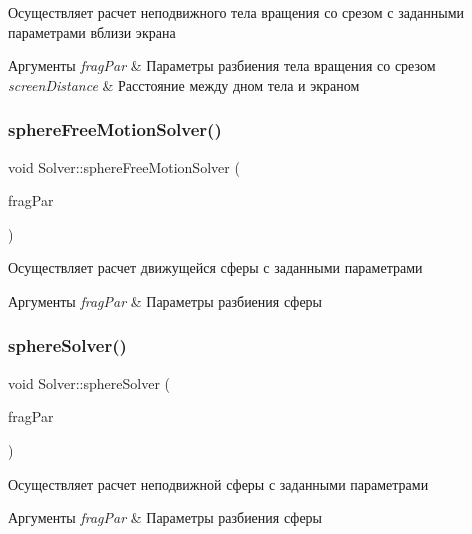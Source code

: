 Осуществляет расчет неподвижного тела вращения со срезом с заданными параметрами вблизи экрана 
\begin{DoxyParams}{Аргументы}
{\em frag\+Par} & Параметры разбиения тела вращения со срезом \\
\hline
{\em screen\+Distance} & Расстояние между дном тела и экраном \\
\hline
\end{DoxyParams}
\mbox{\label{class_solver_adeb1acdbfb1be98fc7fb74708e7da782}} 
\subsubsection{\texorpdfstring{sphere\+Free\+Motion\+Solver()}{sphereFreeMotionSolver()}}
{\footnotesize\ttfamily void Solver\+::sphere\+Free\+Motion\+Solver (\begin{DoxyParamCaption}\item[{const \mbox{\hyperlink{struct_fragmentation_parameters}{Fragmentation\+Parameters}} \&}]{frag\+Par }\end{DoxyParamCaption})}

Осуществляет расчет движущейся сферы с заданными параметрами 
\begin{DoxyParams}{Аргументы}
{\em frag\+Par} & Параметры разбиения сферы \\
\hline
\end{DoxyParams}
\mbox{\label{class_solver_a84fbf208353fc2c7426daae963f43a38}} 
\subsubsection{\texorpdfstring{sphere\+Solver()}{sphereSolver()}}
{\footnotesize\ttfamily void Solver\+::sphere\+Solver (\begin{DoxyParamCaption}\item[{const \mbox{\hyperlink{struct_fragmentation_parameters}{Fragmentation\+Parameters}} \&}]{frag\+Par }\end{DoxyParamCaption})}

Осуществляет расчет неподвижной сферы с заданными параметрами 
\begin{DoxyParams}{Аргументы}
{\em frag\+Par} & Параметры разбиения сферы \\
\hline
\end{DoxyParams}
\mbox{\label{class_solver_acab3ecdd76d6a1b50ec0b714042e8539}} 
